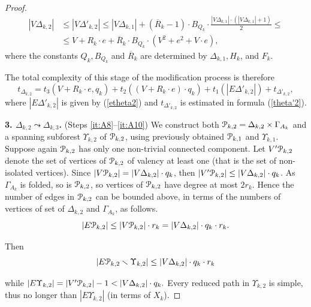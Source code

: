 \documentclass[a4paper,12pt]{article}
\newcommand{\G}{\Gamma }
\newcommand{\D}{\Delta }
\newcommand{\U}{\Upsilon }
\newcommand{\cP}{{\cal{P}}}
\numberwithin{equation}{section}
\numberwithin{figure}{section}
\begin{document}
\begin{proof}
\begin{equation}\label{vtheta2}
\begin{split}
|V\D_{k,2}| &\le |V \D'_{k,2}| \le |V\D_{k,1}|+(\overline{R}_k-1)\cdot B_{Q_k}
\cdot \frac{|V\D_{k,1}|\cdot(|V\D_{k,1}|+1)}{2}\le\\ &\le V + R_k \cdot e +
\overline{R}_k \cdot B_{Q_k}\cdot (V^2 + e^2+V\cdot e),
\end{split}
\end{equation}
where the constants $Q_k, B_{Q_k}$ and  $\overline{R}_k$ are determined  by $\D_{k,1},
H_k$, and $F_k$.


The total complexity of this stage of the modification process is
therefore
\begin{equation}\label{theta2}
t_{\D_{k,2}} = t_3(V + R_k \cdot e, q_k) + t_2((V + R_k \cdot e) \cdot
q_k)+ t_1(|E\D'_{k,2}|) + t_{\D'_{k,2}},
\end{equation}
where $|E\D'_{k,2}|$ is given by (\ref{etheta2}) and $t_{\D'_{k,2}}$ is
estimated in formula (\ref{theta'2}).


{\bf 3. $\D_{k,2} \leadsto \D_{k,3}$.} (Steps \ref{it:A8}--\ref{it:A10}) We construct both $\cP_{k,2}=\D_{k,2}\times \G_{A_k}$ and a spanning
subforest $\U_{k,2}$ of $\cP_{k,2}$, using previously obtained $\cP_{k,1}$ and $\U_{k,1}$. Suppose again
$\cP_{k,2}$ has only one non-trivial connected component.
 Let $V'\cP_{k,2}$ denote the set of vertices of $\cP_{k,2}$ of valency at least one
(that is the set of non-isolated vertices). Since $|V\cP_{k,2}|=|V\D_{k,2}|\cdot q_k$, then $|V'\cP_{k,2}|
\le |V\D_{k,2}|\cdot q_k$. As $\G_{A_k}$ is folded, so is $\cP_{k,2}$, so
vertices of $\cP_{k,2}$ have degree at most $2r_k$. Hence the number of
edges in $\cP_{k,2}$ can be bounded above, in terms of the numbers of
vertices of set of $\D_{k,2}$ and $\G_{A_k}$, as follows.
\[ |E\cP_{k,2}| \le |V\cP_{k,2}|\cdot r_k =|V\D_{k,2}|\cdot q_k \cdot r_k.\]

Then
\[|E\cP_{k,2}\smallsetminus \U_{k,2}| \le |V\D_{k,2}|\cdot q_k \cdot r_k\]

while $|E \U_{k,2}| = |V'\cP_{k,2}| - 1 < |V\D_{k,2}|\cdot q_k.$ Every reduced
path in $\U_{k,2}$ is simple, thus no longer than $|E\U_{k,2}|$ (in terms
of $X_k$).


\end{proof}
\end{document}
